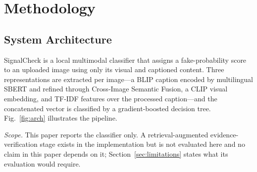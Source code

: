 \documentclass[conference,a4paper]{IEEEtran}
\newcommand{\sysname}{SignalCheck}
\begin{document}
\section{Methodology}

\subsection{System Architecture}

\sysname{} is a local multimodal classifier that assigns a fake-probability
score to an uploaded image using only its visual and captioned content. Three
representations are extracted per image---a BLIP caption encoded by
multilingual SBERT and refined through Cross-Image Semantic Fusion, a CLIP
visual embedding, and TF-IDF features over the processed caption---and the
concatenated vector is classified by a gradient-boosted decision tree.
Fig.~\ref{fig:arch} illustrates the pipeline.

\emph{Scope.} This paper reports the classifier only. A retrieval-augmented
evidence-verification stage exists in the implementation but is not evaluated
here and no claim in this paper depends on it; Section~\ref{sec:limitations}
states what its evaluation would require.
\end{document}
